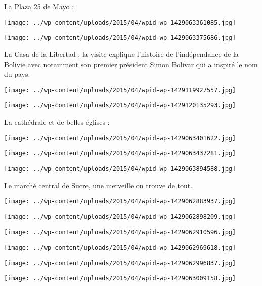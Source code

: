 \pagebreak
 La Plaza 25 de Mayo :
\begin{center} \texttt{[image: ../wp-content/uploads/2015/04/wpid-wp-1429063361085.jpg]} \end{center}
\begin{center} \texttt{[image: ../wp-content/uploads/2015/04/wpid-wp-1429063375686.jpg]} \end{center}

\pagebreak
 La Casa de la Libertad : la visite explique l'histoire de l'indépendance de la Bolivie avec notamment son premier président Simon Bolivar qui a inspiré le nom du pays. 
\begin{center} \texttt{[image: ../wp-content/uploads/2015/04/wpid-wp-1429119927557.jpg]} \end{center}
\begin{center} \texttt{[image: ../wp-content/uploads/2015/04/wpid-wp-1429120135293.jpg]} \end{center}

\pagebreak
 La cathédrale et de belles églises :
\begin{center} \texttt{[image: ../wp-content/uploads/2015/04/wpid-wp-1429063401622.jpg]} \end{center}
\begin{center} \texttt{[image: ../wp-content/uploads/2015/04/wpid-wp-1429063437281.jpg]} \end{center}
\begin{center} \texttt{[image: ../wp-content/uploads/2015/04/wpid-wp-1429063894588.jpg]} \end{center}

 Le marché central de Sucre, une merveille on trouve de tout. 
\begin{center} \texttt{[image: ../wp-content/uploads/2015/04/wpid-wp-1429062883937.jpg]} \end{center}
\begin{center} \texttt{[image: ../wp-content/uploads/2015/04/wpid-wp-1429062898209.jpg]} \end{center}
\begin{center} \texttt{[image: ../wp-content/uploads/2015/04/wpid-wp-1429062910596.jpg]} \end{center}
\begin{center} \texttt{[image: ../wp-content/uploads/2015/04/wpid-wp-1429062969618.jpg]} \end{center}
\begin{center} \texttt{[image: ../wp-content/uploads/2015/04/wpid-wp-1429062996837.jpg]} \end{center}
\begin{center} \texttt{[image: ../wp-content/uploads/2015/04/wpid-wp-1429063009158.jpg]} \end{center}

